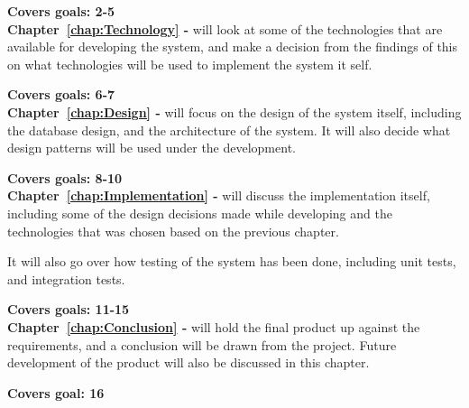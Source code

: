 \textbf{Covers goals: 2-5}\\

\textbf{Chapter~\ref{chap:Technology} - } will look at
some of the technologies that are available for developing the system, and make
a decision from the findings of this on what technologies will be used to
implement the system it self. 

\textbf{Covers goals: 6-7}\\

\textbf{Chapter~\ref{chap:Design} - } will focus on the
design of the system itself, including the database design, and the architecture
of the system. It will also decide what design patterns will be used under the
development. 

\textbf{Covers goals: 8-10}\\

\textbf{Chapter~\ref{chap:Implementation} - } will
discuss the implementation itself, including some of the design decisions made
while developing and the technologies that was chosen based on the previous
chapter. 

It will also go over how testing of the system has been done, including unit
tests, and integration tests. 

\textbf{Covers goals: 11-15}\\


\textbf{Chapter~\ref{chap:Conclusion} - } will hold the
final product up against the requirements, and a conclusion will be drawn from
the project. Future development of the product will also be discussed in this
chapter. 

\textbf{Covers goal: 16}
